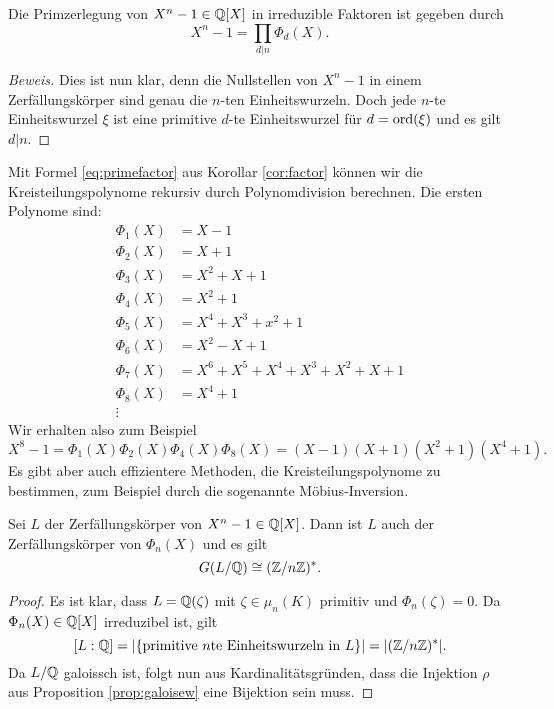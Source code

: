 \documentclass{book}
\begin{document}
\begin{cor}\label{cor:factor} Die Primzerlegung von $X^n -1 \in \mathbb{Q}[X]$ in irreduzible Faktoren ist gegeben durch
	\begin{equation}\label{eq:primefactor}
			X^n-1 = \prod_{d|n} \Phi_d(X).
	\end{equation}
\end{cor}
\begin{proof}[Beweis]
	Dies ist nun klar, denn die Nullstellen von $X^n -1$ in einem Zerfällungskörper sind genau die
	$n$-ten Einheitswurzeln. Doch jede $n$-te Einheitswurzel $\xi$ ist eine primitive $d$-te
	Einheitswurzel für $d = \operatorname{ord}(\xi)$ und es gilt $d|n$. 
\end{proof}

\begin{exa}
	Mit Formel \eqref{eq:primefactor} aus Korollar \ref{cor:factor} können wir die
	Kreisteilungspolynome rekursiv durch Polynomdivision berechnen. Die ersten Polynome sind:
	\[
		\begin{aligned}
			\Phi_1(X) &= X - 1\\
			\Phi_2(X) &= X + 1\\
			\Phi_3(X) &= X^2 + X + 1\\
			\Phi_4(X) &= X^2 + 1\\
			\Phi_5(X) &= X^4 + X^3 + x^2 + 1\\
			\Phi_6(X) &= X^2 - X + 1\\
			\Phi_7(X) &= X^6 + X^5 + X^4 + X^3 + X^2 + X + 1\\
			\Phi_8(X) &= X^4 + 1\\
			\vdots
		\end{aligned}
	\]
	Wir erhalten also zum Beispiel
	\[
		X^8 - 1 = \Phi_1(X)\Phi_2(X)\Phi_4(X)\Phi_8(X) = (X-1)(X+1)(X^2+1)(X^4+1).
	\]
	Es gibt aber auch effizientere Methoden, die Kreisteilungspolynome zu bestimmen, zum
	Beispiel durch die sogenannte Möbius-Inversion. 
\end{exa}

\begin{cor}
    \label{cor:galewprim}
    Sei $L$ der Zerfällungskörper von $X^n -1 \in \mathbb{Q}[X]$. Dann ist $L$ auch der Zerfällungskörper von $\Phi_n(X)$ und es gilt
    \[
        G(L/\mathbb{Q}) \cong (\mathbb{Z}/n\mathbb{Z})^*.
    \]
\end{cor}
\begin{proof}
    Es ist klar, dass $L = \mathbb{Q}(\zeta)$ mit $\zeta \in \mu_n(K)$ primitiv und $\Phi_n(\zeta) = 0$. Da $\Phi_n(X) \in \mathbb{Q}[X]$ irreduzibel ist, gilt
    \[
        [L:\mathbb{Q}] = |\{\text{primitive $n$te Einheitswurzeln in $L$}\}| = |(\mathbb{Z}/n\mathbb{Z})^*|.
    \]
    Da $L/\mathbb{Q}$ galoissch ist, folgt nun aus Kardinalitätsgründen, dass die Injektion $\rho$ aus Proposition \ref{prop:galoisew} eine Bijektion sein muss.
\end{proof}
\end{document}
